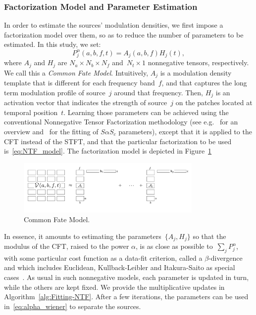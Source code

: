\subsubsection{Factorization Model and Parameter Estimation}
\label{sub:NTF}

In order to estimate the sources' modulation densities, we first impose
a factorization model over them, so as to reduce the number of parameters
to be estimated. In this study, we set:
\begin{equation}
P_{j}^{\alpha}\left(a,b,f,t\right)=A_{j}\left(a,b,f\right)H_{j}\left(t\right),\label{eq:NTF_model}
\end{equation}
where $A_{j}$ and $H_{j}$ are $N_{a}\times N_{b}\times N_{f}$ and~$N_{t}\times1$
nonnegative tensors, respectively. We call this a \emph{Common Fate
Model}. Intuitively, $A_{j}$ is a modulation density template that
is different for each frequency band~$f$, and that captures the
long term modulation profile of source~$j$ around that frequency.
Then, $H_{j}$ is an activation vector that indicates the strength
of source~$j$ on the patches located at temporal position~$t$.
Learning those parameters can be achieved using the conventional Nonnegative
Tensor Factorization methodology (see e.g.~\cite{cichoki09,ozerov12,smaragdis14}
for an overview and~\cite{liutkus15b} for the fitting of $S\alpha S_{c}$
parameters), except that it is applied to the CFT instead of the STFT,
and that the particular factorization to be used is~\eqref{eq:NTF_model}.
The factorization model is depicted in Figure~\ref{fig:cfm}

\begin{figure}[h]
\centering
\includegraphics[width=0.8\textwidth]{Chapters/06_Separation_Unknown/figures/cfm.pdf}
\caption{Common Fate Model.}
\label{fig:cfm}
\end{figure}

In essence, it amounts to estimating the parameters~$\{ A_{j},H_{j}\} $
so that the modulus of the CFT, raised to the power $\alpha$, is
as close as possible to~$\sum_{j}P_{j}^{\alpha}$, with some particular
cost function as a data-fit criterion, called a $\beta$-divergence
and which includes Euclidean, Kullback-Leibler and Itakura-Saito as
special cases~\cite{fitzgerald08a}. As usual in such nonnegative models,
each parameter is updated in turn, while the others are kept fixed.
We provide the multiplicative updates in Algorithm~\ref{alg:Fitting-NTF}.
After a few iterations, the parameters can be used in~\eqref{eq:alpha_wiener} to separate
the sources.

